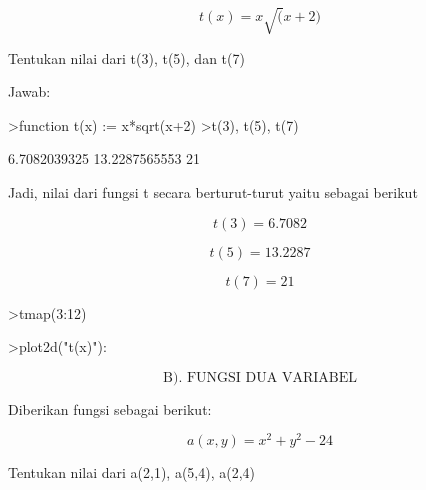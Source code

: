 \documentclass{article}
\begin{document}
\begin{eulernotebook}
\begin{eulercomment}
\end{eulercomment}
\begin{eulerformula}
\[
t(x)= x\sqrt(x+2)
\]
\end{eulerformula}
\begin{eulercomment}
Tentukan nilai dari t(3), t(5), dan t(7)

Jawab:
\end{eulercomment}
\begin{eulerprompt}
>function t(x) := x*sqrt(x+2)
>t(3), t(5), t(7)
\end{eulerprompt}
\begin{euleroutput}
  6.7082039325
  13.2287565553
  21
\end{euleroutput}
\begin{eulercomment}
Jadi, nilai dari fungsi t secara berturut-turut yaitu sebagai berikut\\
\end{eulercomment}
\begin{eulerformula}
\[
t(3) = 6.7082
\]
\end{eulerformula}
\begin{eulerformula}
\[
t(5) = 13.2287
\]
\end{eulerformula}
\begin{eulerformula}
\[
t(7) = 21
\]
\end{eulerformula}
\begin{eulerprompt}
>tmap(3:12)
\end{eulerprompt}
\begin{euleroutput}
  [6.7082,  9.79796,  13.2288,  16.9706,  21,  25.2982,  29.8496,
  34.641,  39.6611,  44.8999]
\end{euleroutput}
\begin{eulerprompt}
>plot2d("t(x)"):
\end{eulerprompt}
\begin{eulercomment}
\end{eulercomment}
\begin{eulerformula}
\[
\text{B). FUNGSI DUA VARIABEL}
\]
\end{eulerformula}
\begin{eulercomment}
\end{eulercomment}
\eulersubheading{}
\begin{eulercomment}
Diberikan fungsi sebagai berikut:

\end{eulercomment}
\begin{eulerformula}
\[
a(x,y)= x^2+y^2-24
\]
\end{eulerformula}
\begin{eulercomment}
Tentukan nilai dari a(2,1), a(5,4), a(2,4)


\end{eulercomment}
\end{eulernotebook}
\end{document}
